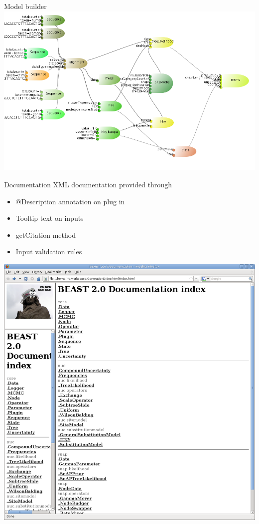 \documentclass{beamer}
\theoremstyle{definition}
\begin{document}
\begin{frame}{Model builder}
\includegraphics[width=\textwidth]{hkymodel2.png}
\end{frame}


\begin{frame}{Documentation}
XML documentation provided through

\begin{itemize}
\item @Description annotation on plug in
\item Tooltip text on inputs
\item getCitation method
\item Input validation rules
\end{itemize}

\includegraphics[width=\textwidth]{beastdoc0.png}

\end{frame}
\end{document}
